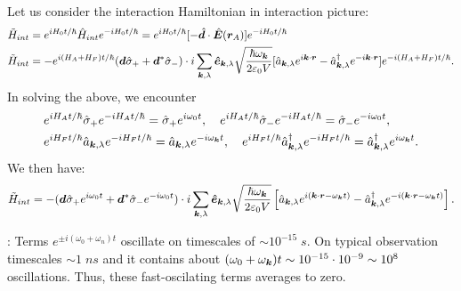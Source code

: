 Let us consider the interaction Hamiltonian in interaction picture:
\begin{align*}
    \tilde{H}_{int}&=e^{iH_0t/\hbar}\hat{H}_{int}e^{-iH_0t/\hbar}=e^{iH_0t/\hbar}[-\hat{\bm{d}}\cdot\hat{\bm{E}}(\bm{r}_A)]e^{-iH_0t/\hbar}\\
    \tilde{H}_{int}&=-e^{i(H_A+H_F)t/\hbar}(\bm{d}\hat{\sigma}_++\bm{d}^*\hat{\sigma}_-)\cdot i\sum_{\bm{k},\lambda}\bm{\hat{e}}_{\bm{k},\lambda}\sqrt{\frac{\hbar\omega_{\bm{k}}}{2\varepsilon_0V}}
    [\hat{a}_{\bm{k},\lambda}e^{i\bm{k}\cdot\bm{r}}-\hat{a}^\dagger_{\bm{k},\lambda}e^{-i\bm{k}\cdot\bm{r}}]e^{-i(H_A+H_F)t/\hbar}.
\end{align*}
In solving the above, we encounter 
\begin{align*}
    &e^{iH_At/\hbar}\hat{\sigma}_+e^{-iH_At/\hbar}=\hat{\sigma}_+e^{i\omega_0t},\quad
    e^{iH_At/\hbar}\hat{\sigma}_-e^{-iH_At/\hbar}=\hat{\sigma}_-e^{-i\omega_0t},\\
    &e^{iH_Ft/\hbar}\hat{a}_{\bm{k},\lambda}e^{-iH_Ft/\hbar}=\hat{a}_{\bm{k},\lambda}e^{-i\omega_{\bm{k}}t},\quad
    e^{iH_Ft/\hbar}\hat{a}^\dagger_{\bm{k},\lambda}e^{-iH_Ft/\hbar}=\hat{a}^\dagger_{\bm{k},\lambda}e^{i\omega_{\bm{k}}t}.
\end{align*}
We then have:
\begin{align*}
    \tilde{H}_{int}=-(\bm{d}\hat{\sigma}_+e^{i\omega_0t}+\bm{d}^*\hat{\sigma}_-e^{-i\omega_0t})\cdot i\sum_{\bm{k},\lambda}\bm{\hat{e}}_{\bm{k},\lambda}
    \sqrt{\frac{\hbar\omega_{\bm{k}}}{2\varepsilon_0V}}\left[\hat{a}_{\bm{k},\lambda}e^{i(\bm{k}\cdot\bm{r}-\omega_{\bm{k}}t)}-\hat{a}^\dagger_{\bm{k},\lambda}e^{-i(\bm{k}\cdot\bm{r}-\omega_{\bm{k}}t)}\right].
\end{align*}

: Terms $e^{\pm i(\omega_0+\omega_n)t}$ oscillate on timescales of $\sim10^{-15}\;s$.
On typical observation timescales $\sim1\;ns$ and it contains about $(\omega_0+\omega_{\bm{k}})t\sim10^{-15}\cdot10^{-9}\sim10^8$ oscillations. 
Thus, these fast-oscilating terms averages to zero.

